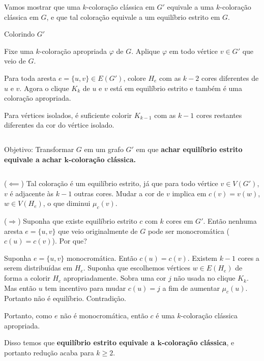 \documentclass{beamer}
\theoremstyle{plain}
\begin{document}
\begin{frame}
  Vamos mostrar que uma $k$-coloração clássica em $G'$ equivale a uma $k$-coloração clássica em
  $G$, e que tal coloração equivale a um equilíbrio estrito em $G$.

  {\color{blue} Colorindo $G'$}

  Fixe uma $k$-coloração apropriada $\varphi$ de $G$. Aplique $\varphi$ em todo vértice $v\in G'$
  que veio de $G$.

  Para toda aresta $e=\{u,v\}\in E(G')$, colore $H_e$ com as $k-2$ cores diferentes de $u$ e $v$.
  Agora o clique $K_k$ de $u$ e $v$ está em equilíbrio estrito e também é uma coloração apropriada.

  Para vértices isolados, é suficiente colorir $K_{k-1}$ com as $k-1$ cores restantes diferentes da
  cor do vértice isolado.
\end{frame}

\begin{frame}
  \begin{columns}[t]
    \begin{column}{0.9\textwidth}
      \begin{block}{Objetivo:}
        Transformar $G$ em um grafo $G'$ em que \textbf{achar equilíbrio estrito equivale a achar
        $\mathbf{k}$-coloração clássica.}
      \end{block}
    \end{column}
  \end{columns}
  \vspace{0.2in}

  ($\impliedby$) Tal coloração é um equilíbrio estrito, já que para todo vértice $v\in V(G')$, $v$
  é adjacente às $k-1$ outras cores. Mudar a cor de $v$ implica em $c(v)=v(w)$, $w\in V(H_e)$, o
  que diminui $\mu_c(v)$.

  (\;$\Longrightarrow$\;) Suponha que existe equilíbrio estrito $c$ com $k$ cores em $G'$. Então
  nenhuma aresta $e=\{u,v\}$ que veio originalmente de $G$ pode ser monocromática ($c(u)=c(v)$).
  Por que?
\end{frame}

\begin{frame}
  Suponha $e=\{u,v\}$ monocromática. Então $c(u)=c(v)$. Existem $k-1$ cores a serem distribuídas em
  $H_e$. Suponha que escolhemos vértices $w\in E(H_e)$ de forma a colorir $H_e$ apropriadamente.
  Sobra uma cor $j$ não usada no clique $K_k$. Mas então $u$ tem incentivo para mudar $c(u)=j$ a
  fim de aumentar $\mu_c(u)$. Portanto não é equilíbrio. Contradição.

  Portanto, como $e$ não é monocromática, então $c$ é uma $k$-coloração clássica apropriada.

  Disso temos que \textbf{equilíbrio estrito equivale a $\mathbf{k}$-coloração clássica}, e
  portanto redução acaba para $k\geq 2$.
\end{frame}
\end{document}
